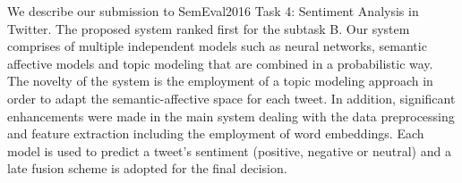 We describe our submission to SemEval2016 Task 4: Sentiment Analysis in Twitter. The proposed system ranked first for the subtask B. Our system comprises of multiple independent models such as neural networks, semantic affective models and topic modeling that are combined in a probabilistic way. The novelty of the system is the employment of a topic modeling approach in order to adapt the semantic-affective space for each tweet. In addition, significant enhancements were made in the main system dealing with the data preprocessing and feature extraction including the employment of word embeddings. Each model is used to predict a tweet's sentiment (positive, negative or neutral) and a late fusion scheme is adopted for the final decision.
